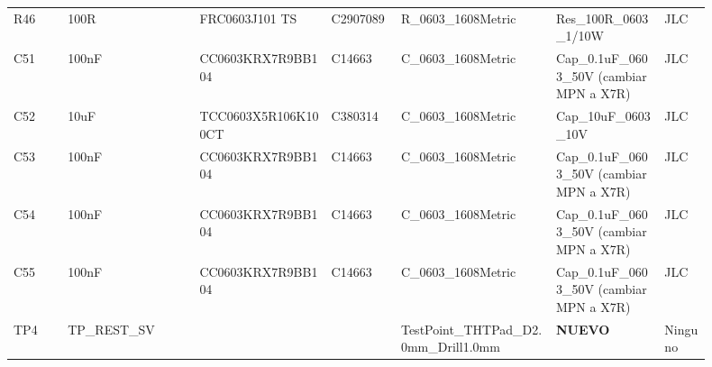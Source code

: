 \documentclass[10pt,a4paper]{article}
\begin{document}
{\begin{longtable}{@{}L{0.07\linewidth}L{0.17\linewidth}L{0.17\linewidth}L{0.09\linewidth}L{0.20\linewidth}L{0.14\linewidth}L{0.06\linewidth}@{}}
R46 & 100R & FRC0603J101 TS & C2907089 & R\_\allowbreak{}0603\_\allowbreak{}1608Metric & Res\_\allowbreak{}100R\_\allowbreak{}0603\_\allowbreak{}1/10W & JLC\\
C51 & 100nF & CC0603KRX7R9BB104 & C14663 & C\_\allowbreak{}0603\_\allowbreak{}1608Metric & Cap\_\allowbreak{}0.1uF\_\allowbreak{}0603\_\allowbreak{}50V (cambiar MPN a X7R) & JLC\\
C52 & 10uF & TCC0603X5R106K100CT & C380314 & C\_\allowbreak{}0603\_\allowbreak{}1608Metric & Cap\_\allowbreak{}10uF\_\allowbreak{}0603\_\allowbreak{}10V & JLC\\
C53 & 100nF & CC0603KRX7R9BB104 & C14663 & C\_\allowbreak{}0603\_\allowbreak{}1608Metric & Cap\_\allowbreak{}0.1uF\_\allowbreak{}0603\_\allowbreak{}50V (cambiar MPN a X7R) & JLC\\
C54 & 100nF & CC0603KRX7R9BB104 & C14663 & C\_\allowbreak{}0603\_\allowbreak{}1608Metric & Cap\_\allowbreak{}0.1uF\_\allowbreak{}0603\_\allowbreak{}50V (cambiar MPN a X7R) & JLC\\
C55 & 100nF & CC0603KRX7R9BB104 & C14663 & C\_\allowbreak{}0603\_\allowbreak{}1608Metric & Cap\_\allowbreak{}0.1uF\_\allowbreak{}0603\_\allowbreak{}50V (cambiar MPN a X7R) & JLC\\
TP4 & TP\_\allowbreak{}REST\_\allowbreak{}SV &  &  & TestPoint\_\allowbreak{}THTPad\_\allowbreak{}D2.0mm\_\allowbreak{}Drill1.0mm & \textbf{NUEVO} & Ninguno\\
\bottomrule\end{longtable}}
\end{document}
